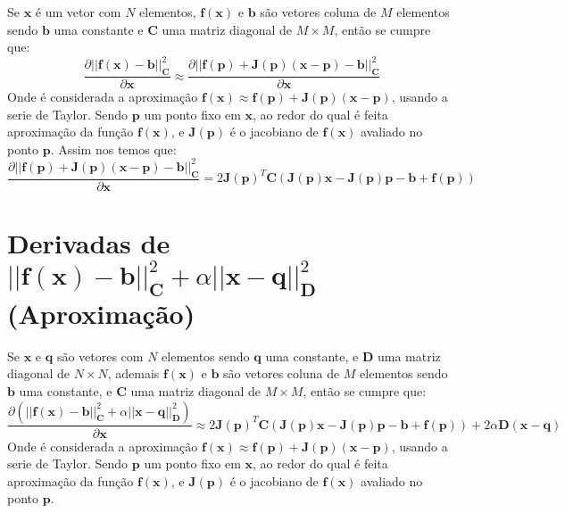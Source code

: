 \begin{theorem}
Se $\mathbf{x}$ é um vetor com $N$ elementos, $\mathbf{f}(\mathbf{x})$ e 
$\mathbf{b}$ são vetores coluna de $M$ elementos sendo $\mathbf{b}$ uma constante e
$\mathbf{C}$ uma matriz diagonal de $M \times M$, 
então se cumpre que:
\begin{equation}
\frac{\partial ||\mathbf{f}(\mathbf{x})-\mathbf{b}||_{\mathbf{C}}^2}{\partial \mathbf{x}} \approx
\frac{\partial ||\mathbf{f}(\mathbf{p})+\mathbf{J}(\mathbf{p})\left(\mathbf{x}-\mathbf{p}\right)-\mathbf{b}||_{\mathbf{C}}^2}{\partial \mathbf{x}}
\end{equation}
Onde é considerada a aproximação
$\mathbf{f}(\mathbf{x})\approx \mathbf{f}(\mathbf{p})+\mathbf{J}(\mathbf{p})\left(\mathbf{x}-\mathbf{p}\right)$,
usando a serie de Taylor. Sendo $\mathbf{p}$ um ponto fixo em $\mathbf{x}$,  ao redor do qual é feita  aproximação
da função $\mathbf{f}(\mathbf{x})$,
e $\mathbf{J}(\mathbf{p})$ é o jacobiano de $\mathbf{f}(\mathbf{x})$ avaliado no ponto $\mathbf{p}$.
Assim nos temos que:
\begin{equation}
\frac{\partial ||\mathbf{f}(\mathbf{p})+\mathbf{J}(\mathbf{p})\left(\mathbf{x}-\mathbf{p}\right)-\mathbf{b}||_{\mathbf{C}}^2}{\partial \mathbf{x}}=
2 \mathbf{J}(\mathbf{p})^{T}\mathbf{C}\left(\mathbf{J}(\mathbf{p})\mathbf{x} - \mathbf{J}(\mathbf{p})\mathbf{p}-\mathbf{b}+\mathbf{f}(\mathbf{p})\right)
\end{equation}
\end{theorem}


\section{Derivadas de $||\mathbf{f}(\mathbf{x})-\mathbf{b}||_{\mathbf{C}}^2+\alpha||\mathbf{x}-\mathbf{q}||_{\mathbf{D}}^2$  
(Aproximação)
}

\begin{theorem}
Se $\mathbf{x}$ e $\mathbf{q}$  são vetores com $N$ elementos sendo $\mathbf{q}$ uma constante,  e
$\mathbf{D}$ uma matriz diagonal de $N \times N$, ademais $\mathbf{f}(\mathbf{x})$ e 
$\mathbf{b}$ são vetores coluna de $M$ elementos sendo $\mathbf{b}$ uma constante, e
$\mathbf{C}$ uma matriz diagonal de $M \times M$, 
então se cumpre que:
\begin{equation}
\frac{\partial \left(||\mathbf{f}(\mathbf{x})-\mathbf{b}||_{\mathbf{C}}^2+\alpha||\mathbf{x}-\mathbf{q}||_{\mathbf{D}}^2\right)}{\partial \mathbf{x}} \approx
2 \mathbf{J}(\mathbf{p})^{T}\mathbf{C}\left(\mathbf{J}(\mathbf{p})\mathbf{x} - \mathbf{J}(\mathbf{p})\mathbf{p}-\mathbf{b}+\mathbf{f}(\mathbf{p})\right)
+2\alpha\mathbf{D}\left(\mathbf{x}-\mathbf{q}\right)
\end{equation}
Onde é considerada a aproximação
$\mathbf{f}(\mathbf{x})\approx \mathbf{f}(\mathbf{p})+\mathbf{J}(\mathbf{p})\left(\mathbf{x}-\mathbf{p}\right)$,
usando a serie de Taylor. Sendo $\mathbf{p}$ um ponto fixo em $\mathbf{x}$,  ao redor do qual é feita  aproximação
da função $\mathbf{f}(\mathbf{x})$,
e $\mathbf{J}(\mathbf{p})$ é o jacobiano de $\mathbf{f}(\mathbf{x})$ avaliado no ponto $\mathbf{p}$.
\end{theorem}